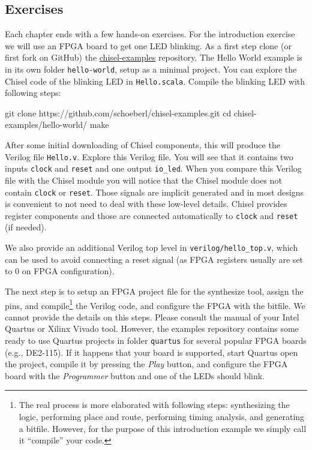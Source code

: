 \documentclass[a4paper]{article}
\newcommand{\code}[1]{{\small{\texttt{#1}}}}
\begin{document}
\subsection{Exercises}

Each chapter ends with a few hands-on exercises. For the introduction exercise we will use an
FPGA board to get one LED blinking.
As a first step clone (or first fork on GitHub) the \href{https://github.com/schoeberl/chisel-examples}{chisel-examples}
repository.
The Hello World example is in its own folder \code{hello-world}, setup as
a minimal project. You can explore the Chisel code of the blinking LED
in \code{Hello.scala}.
Compile the blinking LED with following steps:

\begin{chisel}
git clone https://github.com/schoeberl/chisel-examples.git
cd chisel-examples/hello-world/
make
\end{chisel}

After some initial downloading of Chisel components, this will produce the Verilog file \code{Hello.v}.
Explore this Verilog file. You will see that it contains two inputs \code{clock} and \code{reset}
and one output \code{io\_led}. When you compare this Verilog file with the Chisel module
you will notice that the Chisel module does not contain \code{clock} or \code{reset}.
Those signals are implicit generated and in most designs is convenient to not need to
deal with these low-level details. Chisel provides register components and those
are connected automatically to \code{clock} and \code{reset} (if needed).


We also provide an additional Verilog top level in \code{verilog/hello\_top.v},
which can be used to avoid connecting a reset signal (as FPGA registers usually
are set to 0 on FPGA configuration).

The next step is to setup an FPGA project file for the synthesize tool, assign the pins,
and compile\footnote{The real process is more elaborated with following steps: synthesizing the logic,
performing place and route, performing timing analysis, and generating a bitfile.
However, for the purpose of this introduction example we simply call it ``compile''
your code.} the Verilog code, and configure the FPGA with the bitfile.
We cannot provide the details on this steps. Please consult the manual of
your Intel Quartus or Xilinx Vivado tool.
However, the examples repository contains some ready to use Quartus
projects in folder \code{quartus} for several popular FPGA boards (e.g., DE2-115).
If it happens that your board is supported, start Quartus open the project,
compile it by pressing the \emph{Play} button, and configure the FPGA board
with the \emph{Programmer} button and one of the LEDs should blink.
\end{document}
